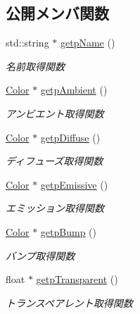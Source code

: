 \subsection*{公開メンバ関数}
\begin{DoxyCompactItemize}
\item 
std\+::string $\ast$ \mbox{\hyperlink{class_md_bin_data_1_1_material_abaa620135fd033cce415e7c949e9a4b6}{getp\+Name}} ()
\begin{DoxyCompactList}\small\item\em 名前取得関数 \end{DoxyCompactList}\item 
\mbox{\hyperlink{class_md_bin_data_1_1_color}{Color}} $\ast$ \mbox{\hyperlink{class_md_bin_data_1_1_material_a5de4c3bff10499fb4fb861b7a13b6180}{getp\+Ambient}} ()
\begin{DoxyCompactList}\small\item\em アンビエント取得関数 \end{DoxyCompactList}\item 
\mbox{\hyperlink{class_md_bin_data_1_1_color}{Color}} $\ast$ \mbox{\hyperlink{class_md_bin_data_1_1_material_a3a66da1fbf79515b1bdff35b0278eb19}{getp\+Diffuse}} ()
\begin{DoxyCompactList}\small\item\em ディフューズ取得関数 \end{DoxyCompactList}\item 
\mbox{\hyperlink{class_md_bin_data_1_1_color}{Color}} $\ast$ \mbox{\hyperlink{class_md_bin_data_1_1_material_aa486af195c8862860ec61245e3933a64}{getp\+Emissive}} ()
\begin{DoxyCompactList}\small\item\em エミッション取得関数 \end{DoxyCompactList}\item 
\mbox{\hyperlink{class_md_bin_data_1_1_color}{Color}} $\ast$ \mbox{\hyperlink{class_md_bin_data_1_1_material_aec6d9f8f6c8e733c9165d39eebd55cc1}{getp\+Bump}} ()
\begin{DoxyCompactList}\small\item\em バンプ取得関数 \end{DoxyCompactList}\item 
float $\ast$ \mbox{\hyperlink{class_md_bin_data_1_1_material_a93eee0080dcebaa2f75fdfd6fc353ce0}{getp\+Transparent}} ()
\begin{DoxyCompactList}\small\item\em トランスペアレント取得関数 \end{DoxyCompactList}\item 

\end{DoxyCompactItemize}
